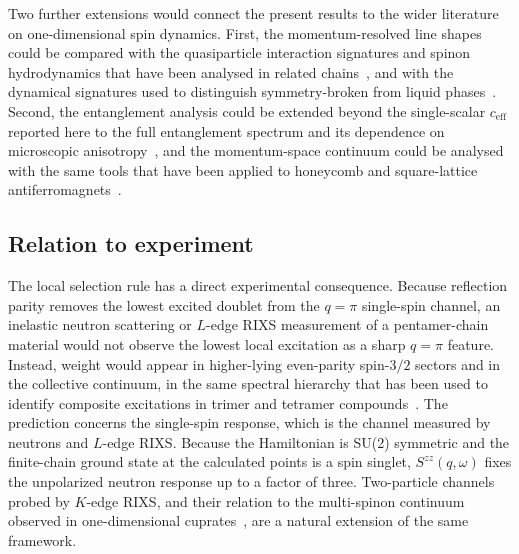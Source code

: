 Two further extensions would connect the present results to the wider literature
on one-dimensional spin dynamics.
First, the momentum-resolved line shapes could be compared with the quasiparticle
interaction signatures and spinon hydrodynamics that have been analysed in
related chains~\cite{keselman2020,balents2020,wang2022hydro}, and with the
dynamical signatures used to distinguish symmetry-broken from liquid
phases~\cite{drescher2023,li2023dqcpsteer}.
Second, the entanglement analysis could be extended beyond the single-scalar
$c_{\mathrm{eff}}$ reported here to the full entanglement spectrum and its
dependence on microscopic anisotropy~\cite{kargarian2008}, and the momentum-space
continuum could be analysed with the same tools that have been applied to
honeycomb and square-lattice
antiferromagnets~\cite{gu2022honeycomb,wu2022j1j3}.

\subsection{Relation to experiment}

The local selection rule has a direct experimental consequence.
Because reflection parity removes the lowest excited doublet from the $q=\pi$
single-spin channel, an inelastic neutron scattering or $L$-edge RIXS measurement
of a pentamer-chain material would not observe the lowest local excitation as a
sharp $q=\pi$ feature.
Instead, weight would appear in higher-lying even-parity spin-$3/2$ sectors and in
the collective continuum, in the same spectral hierarchy that has been used to
identify composite excitations in trimer and tetramer
compounds~\cite{cheng2022trimer,li2025rixstrimer,li2026tetramer,prabhakar2025trimer}.
The prediction concerns the single-spin response, which is the channel measured
by neutrons and $L$-edge RIXS.
Because the Hamiltonian is SU(2) symmetric and the finite-chain ground state at
the calculated points is a spin singlet, $S^{zz}(q,\omega)$ fixes the unpolarized
neutron response up to a factor of three.
Two-particle channels probed by $K$-edge RIXS, and their relation to the
multi-spinon continuum observed in one-dimensional
cuprates~\cite{schlappa2018,ishii2025kedge,kumar2020,forte2011}, are a natural
extension of the same framework.
